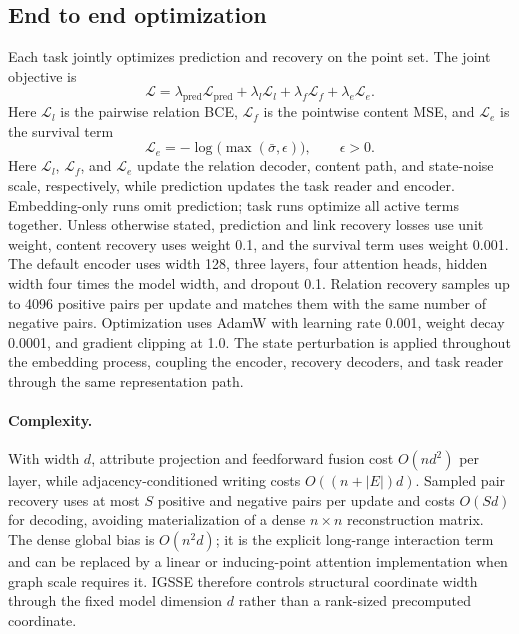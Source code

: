 \subsection{End to end optimization}
\label{sec:training}
Each task jointly optimizes prediction and recovery on the point set.  The joint objective is
\begin{equation}
 \mathcal L=\lambda_{\mathrm{pred}}\mathcal L_{\mathrm{pred}}
 +\lambda_l\mathcal L_l+\lambda_f\mathcal L_f+\lambda_e\mathcal L_e.
 \label{eq:objective}
\end{equation}
Here $\mathcal L_l$ is the pairwise relation BCE, $\mathcal L_f$ is the
pointwise content MSE, and $\mathcal L_e$ is the survival term
\begin{equation}
 \mathcal L_e=-\log\bigl(\max(\bar\sigma,\epsilon)\bigr),\qquad \epsilon>0.
 \label{eq:alive-loss}
\end{equation}
Here $\mathcal L_l$, $\mathcal L_f$, and $\mathcal L_e$ update the relation
decoder, content path, and state-noise scale, respectively, while prediction
updates the task reader and encoder.  Embedding-only runs omit prediction;
task runs optimize all active terms together.
Unless otherwise stated, prediction and link recovery losses use unit weight,
content recovery uses weight 0.1, and the survival term uses weight 0.001.  The
default encoder uses width 128, three layers, four attention heads, hidden width
four times the model width, and dropout 0.1.  Relation recovery samples up to
4096 positive pairs per update and matches them with the same number of negative
pairs.  Optimization uses AdamW with learning rate 0.001, weight decay 0.0001,
and gradient clipping at 1.0.
The state perturbation is applied throughout the embedding process, coupling
the encoder, recovery decoders, and task reader through the same representation
path.

\paragraph{Complexity.}
With width $d$, attribute projection and feedforward fusion cost
$O(nd^2)$ per layer, while adjacency-conditioned writing costs
$O((n+|E|)d)$.  Sampled pair recovery uses at most $S$ positive and negative
pairs per update and costs $O(Sd)$ for decoding, avoiding materialization of a
dense $n\times n$ reconstruction matrix.  The dense global bias is
$O(n^2d)$; it is the explicit long-range interaction term and can be replaced
by a linear or inducing-point attention implementation when graph scale
requires it.  IGSSE therefore controls structural coordinate width through the
fixed model dimension $d$ rather than a rank-sized precomputed coordinate.
